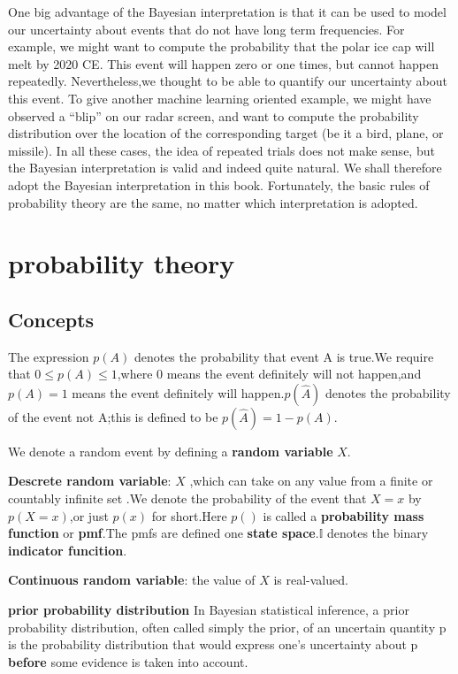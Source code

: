 One big advantage of the Bayesian interpretation is that it can be used to model our uncertainty about events that do not have long term frequencies. For example, we might want to compute the probability that the polar ice cap will melt by 2020 CE. This event will happen zero or one times, but cannot happen repeatedly. Nevertheless,we thought to be able to quantify our uncertainty about this event. To give another machine learning oriented example, we might have observed a “blip” on our radar screen, and want to compute the
probability distribution over the location of the corresponding target (be it a bird, plane, or missile). In all these cases, the idea of repeated trials does not make sense, but the Bayesian interpretation is valid and indeed quite natural. We shall therefore adopt the Bayesian interpretation in this book. Fortunately, the
basic rules of probability theory are the same, no matter which interpretation is adopted.


\section{probability theory}

\subsection{Concepts}
The expression $p(A)$ denotes the probability that event A is true.We require that $0\leq p(A) \leq 1$,where 0 means the event definitely will not happen,and $p(A)=1$ means the event definitely will happen.$p(\hat{A})$ denotes the probability of the event not A;this is defined to be $p(\hat{A})=1-p(A)$.

We denote a random event by defining a \textbf{random variable} $X$.

\textbf{Descrete random variable}: $X$ ,which can take on any value from a finite or countably infinite set .We denote the probability of the event that $X=x$ by $p(X=x)$,or just $p(x)$ for short.Here $p()$ is called a \textbf{probability mass function} or \textbf{pmf}.The pmfs are defined one \textbf{state space}.$\mathbb{I}$ denotes the binary \textbf{indicator funcition}.

\textbf{Continuous random variable}: the value of $X$ is real-valued.

\textbf{prior probability distribution}
In Bayesian statistical inference, a prior probability distribution, often called simply the prior, of an uncertain quantity p is the probability distribution that would express one's uncertainty about p \textbf{before} some evidence is taken into account.

